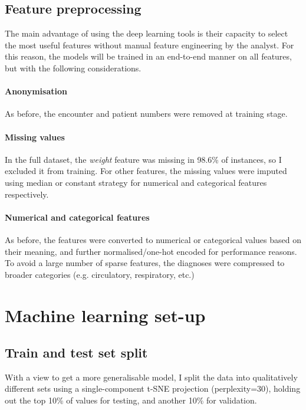 \documentclass[10pt, twocolumn]{article}
\begin{document}
\subsection{Feature preprocessing}

The main advantage of using the deep learning tools is their capacity to select the most useful features without manual feature engineering by the analyst. For this reason, the models will be trained in an end-to-end manner on all features, but with the following considerations.

\paragraph{Anonymisation} As before, the encounter and patient numbers were removed at training stage.

\paragraph{Missing values} In the full dataset, the \textit{weight} feature was missing in 98.6\% of instances, so I excluded it from training. For other features, the missing values were imputed using median or constant strategy for numerical and categorical features respectively.

\paragraph{Numerical and categorical features} As before, the features were converted to numerical or categorical values based on their meaning, and further normalised/one-hot encoded for performance reasons. To avoid a large number of sparse features, the diagnoses were compressed to broader categories (e.g. circulatory, respiratory, etc.)


\section{Machine learning set-up}

\subsection{Train and test set split}
With a view to get a more generalisable model, I split the data into qualitatively different sets using a single-component t-SNE projection (perplexity=30), holding out the top 10\% of values for testing, and another 10\% for validation.
\end{document}
